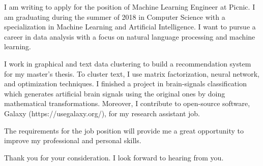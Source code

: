 \documentclass[12pt,stdletter,dateno]{newlfm}
\begin{document}
\begin{newlfm}

I am writing to apply for the position of Machine Learning Engineer at Picnic. I am graduating during the summer of 2018 in Computer Science with a specialization in Machine Learning and Artificial Intelligence. I want to pursue a career in data analysis with a focus on natural language processing and machine learning.

I work in graphical and text data clustering to build a recommendation system for my master's thesis. To cluster text, I use matrix factorization, neural network, and optimization techniques. I finished a project in brain-signals classification which generates artificial brain signals using the original ones by doing mathematical transformations. Moreover, I contribute to open-source software, Galaxy (https://usegalaxy.org/), for my research assistant job.

The requirements for the job position will provide me a great opportunity to improve my professional and personal skills.

Thank you for your consideration. I look forward to
hearing from you.

\end{newlfm}
\end{document}
